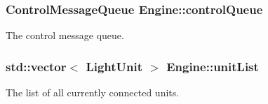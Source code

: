 \subsubsection[{\texorpdfstring{control\+Queue}{controlQueue}}]{\setlength{\rightskip}{0pt plus 5cm}Control\+Message\+Queue Engine\+::control\+Queue}\hypertarget{namespaceEngine_a300dfed93e6ea0213f64e184373517ed}{}\label{namespaceEngine_a300dfed93e6ea0213f64e184373517ed}
The control message queue. 
\subsubsection[{\texorpdfstring{unit\+List}{unitList}}]{\setlength{\rightskip}{0pt plus 5cm}std\+::vector$<$ Light\+Unit $>$ Engine\+::unit\+List}\hypertarget{namespaceEngine_af251daeaa5143c5915b7726e6eb6a72d}{}\label{namespaceEngine_af251daeaa5143c5915b7726e6eb6a72d}
The list of all currently connected units. 